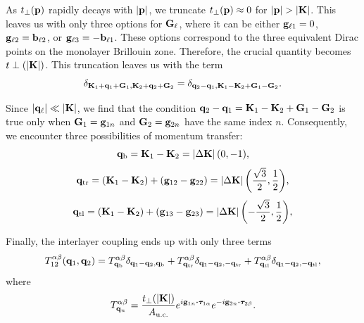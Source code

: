 \documentclass[12pt]{report}
\begin{document}
As $t_\perp({\vb{p}})$ rapidly decays with $\abs{{\vb{p}}}$, we truncate $t_\perp({\vb{p}}) \approx 0$ for $\abs{{\vb{p}}} > \abs{\vb{K}}$. This leaves us with only three options for ${\vb{G}}_\ell$, where it can be either ${\vb{g}}_{\ell 1} = 0$, ${\vb{g}}_{\ell 2} = \vb{b}_{\ell 2}$, or ${\vb{g}}_{\ell 3} = -\vb{b}_{\ell 1}$. These options correspond to the three equivalent Dirac points on the monolayer Brillouin zone. Therefore, the crucial quantity becomes $t\perp(\abs{\vb{K}})$. This truncation leaves us with the term
\begin{equation} \label{eq:delta-term}
\delta_{\vb{K}_1+{\vb{q}}_1+{\vb{G}}_1,\vb{K}_2+{\vb{q}}_2+{\vb{G}}_2} = \delta_{{\vb{q}}_2-{\vb{q}}_1,\vb{K}_1-\vb{K}_2+{\vb{G}}_1-{\vb{G}}_2}.
\end{equation}

Since $\abs{{\vb{q}}_\ell} \ll \abs{\vb{K}}$, we find that the condition ${\vb{q}}_2-{\vb{q}}_1 = \vb{K}_1-\vb{K}_2+{\vb{G}}_1-{\vb{G}}_2$ is true only when ${\vb{G}}_1 = {\vb{g}}_{1n}$ and ${\vb{G}}_2 = {\vb{g}}_{2n}$ have the same index $n$. Consequently, we encounter three possibilities of momentum transfer:
\begin{equation} \label{eq:qb}
{\vb{q}}_\text{b} = \vb{K}_1 - \vb{K}_2 = \abs{\Delta \vb{K}} \, \qty(0, -1),
\end{equation}
\begin{equation} \label{eq:qtr}
{\vb{q}}_\text{tr} = (\vb{K}_1 - \vb{K}_2) + ({\vb{g}}_{12} - {\vb{g}}_{22}) = \abs{\Delta \vb{K}} \, \qty(\frac{\sqrt{3}}{2}, \frac{1}{2}),
\end{equation}
\begin{equation} \label{eq:qtl}
{\vb{q}}_\text{tl} = (\vb{K}_1 - \vb{K}_2) + ({\vb{g}}_{13} - {\vb{g}}_{23}) = \abs{\Delta \vb{K}} \, \qty(-\frac{\sqrt{3}}{2}, \frac{1}{2}),
\end{equation}

Finally, the interlayer coupling ends up with only three terms
\begin{equation} \label{eq:interlayer-3terms}
T_{12}^{\alpha\beta}({\vb{q}}_1,{\vb{q}}_2) =
T^{\alpha\beta}_{{\vb{q}}_\text{b}} \delta_{{\vb{q}}_1-{\vb{q}}_2, {\vb{q}}_\text{b}} +
T^{\alpha\beta}_{{\vb{q}}_\text{tr}} \delta_{{\vb{q}}_1-{\vb{q}}_2, -{\vb{q}}_\text{tr}} +
T^{\alpha\beta}_{{\vb{q}}_\text{tl}} \delta_{{\vb{q}}_1-{\vb{q}}_2, -{\vb{q}}_\text{tl}},
\end{equation}
where
\begin{equation} \label{eq:interlayer-tensor}
T^{\alpha\beta}_{\q_n} = \frac{t_\perp(\abs{\K})}{A_{\text{u.c.}}} e^{i \g_{1n} \vdot \bm{\tau}_{1\alpha}}
e^{-i \g_{2n} \vdot \bm{\tau}_{2\beta}}.
\end{equation}
\end{document}
